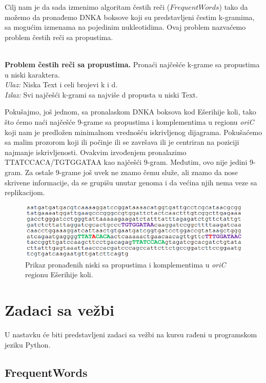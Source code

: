 Cilj nam je da sada izmenimo algoritam čestih reči ($FrequentWords$) tako da možemo da pronađemo DNKA boksove koji su predstavljeni čestim k-gramima, sa mogućim izmenama na pojedinim nukleotidima. Ovaj problem nazvaćemo problem čestih reči sa propustima.\\\\
\begin{tcolorbox}
\textbf{Problem čestih reči sa propustima.} Pronaći najčešće k-grame sa
propustima u niski karaktera.\\
\textit{Ulaz:} Niska Text i celi brojevi k i d.\\
\textit{Izlaz:} Svi najčešći k-grami sa najviše d propusta u niski Text. \\
\end{tcolorbox}
Pokušajmo, još jednom, sa pronalaskom DNKA boksova kod Ešerihije koli, tako što ćemo naći najčešće 9-grame sa propustima i komplementima u regionu \textit{oriC} koji nam je predložen minimalnom vrednošću iskrivljenog dijagrama. Pokušaćemo sa malim prozorom koji ili počinje ili se završava ili je centriran na poziciji najmanje iskrivljenosti. Ovakvim izvođenjem pronalazimo TTATCCACA/TGTGGATAA kao najčešći 9-gram. Međutim, ovo nije jedini 9-gram. Za ostale 9-grame još uvek ne znamo čemu služe, ali znamo da nose skrivene informacije, da se grupišu unutar genoma i da većina njih nema veze sa replikacijom. 

\begin{figure}[H]
\caption{Prikaz pronađenih niski sa propustima i komplementima u \textit{oriC} regionu Ešerihije koli.}
\centering
\includegraphics[width=1\textwidth]{poglavlja/1/slike/ecoli_poslednji.png}
\end{figure} 

\newpage

\section{Zadaci sa vežbi}
U nastavku će biti predstavljeni zadaci sa vežbi na kursu rađeni u programskom jeziku Python.

\subsection{FrequentWords}

